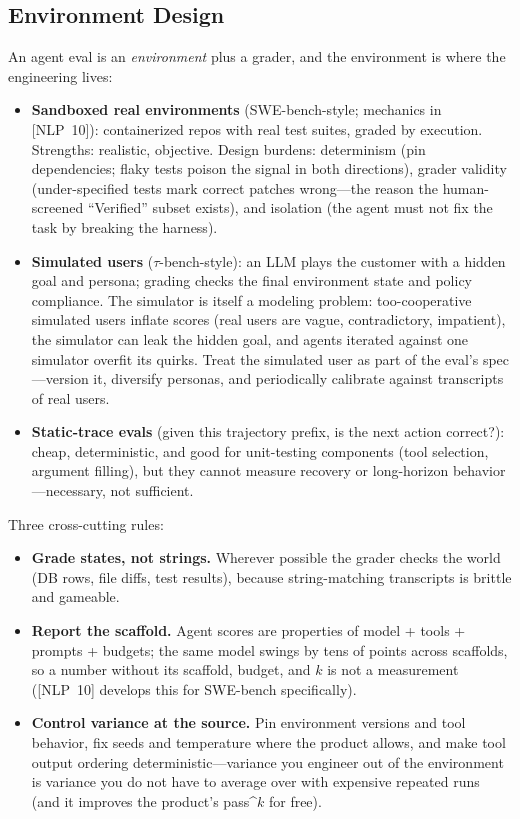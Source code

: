 \subsection{Environment Design}

An agent eval is an \textit{environment} plus a grader, and the environment is where the engineering lives:

\begin{itemize}
    \item \textbf{Sandboxed real environments} (SWE-bench-style; mechanics in [NLP~10]): containerized repos with real test suites, graded by execution. Strengths: realistic, objective. Design burdens: determinism (pin dependencies; flaky tests poison the signal in both directions), grader validity (under-specified tests mark correct patches wrong---the reason the human-screened ``Verified'' subset exists), and isolation (the agent must not fix the task by breaking the harness).
    \item \textbf{Simulated users} ($\tau$-bench-style): an LLM plays the customer with a hidden goal and persona; grading checks the final environment state and policy compliance. The simulator is itself a modeling problem: too-cooperative simulated users inflate scores (real users are vague, contradictory, impatient), the simulator can leak the hidden goal, and agents iterated against one simulator overfit its quirks. Treat the simulated user as part of the eval's spec---version it, diversify personas, and periodically calibrate against transcripts of real users.
    \item \textbf{Static-trace evals} (given this trajectory prefix, is the next action correct?): cheap, deterministic, and good for unit-testing components (tool selection, argument filling), but they cannot measure recovery or long-horizon behavior---necessary, not sufficient.
\end{itemize}

Three cross-cutting rules:

\begin{itemize}
    \item \textbf{Grade states, not strings.} Wherever possible the grader checks the world (DB rows, file diffs, test results), because string-matching transcripts is brittle and gameable.
    \item \textbf{Report the scaffold.} Agent scores are properties of model + tools + prompts + budgets; the same model swings by tens of points across scaffolds, so a number without its scaffold, budget, and $k$ is not a measurement ([NLP~10] develops this for SWE-bench specifically).
    \item \textbf{Control variance at the source.} Pin environment versions and tool behavior, fix seeds and temperature where the product allows, and make tool output ordering deterministic---variance you engineer out of the environment is variance you do not have to average over with expensive repeated runs (and it improves the product's pass\textasciicircum{}$k$ for free).
\end{itemize}

